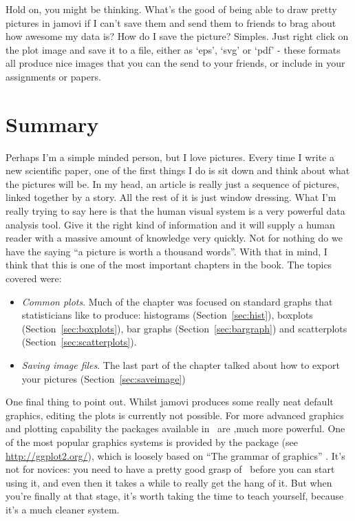 Hold on, you might be thinking. What's the good of being able to draw pretty pictures in jamovi if I can't save them and send them to friends to brag about how awesome my data is? How do I save the picture? Simples. Just right click on the plot image and save it to a file, either as `eps', `svg' or `pdf' - these formats all produce nice images that you can the send to your friends, or include in your assignments or papers.


\section{Summary}

Perhaps I'm a simple minded person, but I love pictures. Every time I write a new scientific paper, one of the first things I do is sit down and think about what the pictures will be. In my head, an article is really just a sequence of pictures, linked together by a story. All the rest of it is just window dressing. What I'm really trying to say here is that the human visual system is a very powerful data analysis tool. Give it the right kind of information and it will supply a human reader with a massive amount of knowledge very quickly. Not for nothing do we have the saying ``a picture is worth a thousand words''. With that in mind, I think that this is one of the most important chapters in the book. The topics covered were:

\begin{itemize}
\item {\it Common plots}. Much of the chapter was focused on standard graphs that statisticians like to produce: histograms (Section~\ref{sec:hist}), boxplots (Section~\ref{sec:boxplots}), bar graphs (Section~\ref{sec:bargraph}) and scatterplots (Section~\ref{sec:scatterplots}). 
\item {\it Saving image files}. The last part of the chapter talked about how to export your pictures (Section~\ref{sec:saveimage})
\end{itemize} 

\noindent
One final thing to point out. Whilst jamovi produces some really neat default graphics, editing the plots is currently not possible. For more advanced graphics and plotting capability the packages available in \R\ are ,much more powerful. One of the most popular graphics systems is provided by the  package (see \url{http://ggplot2.org/}), which is loosely based on ``The grammar of graphics'' \parencite{Wilkinson2006}. It's not for novices: you need to have a pretty good grasp of \R\ before you can start using it, and even then it takes a while to really get the hang of it. But when you're finally at that stage, it's worth taking the time to teach yourself, because it's a much cleaner system.





